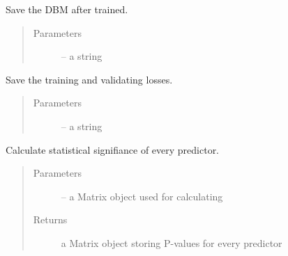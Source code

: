 \documentclass[letterpaper,10pt,english]{sphinxmanual}
\begin{document}
\begin{fulllineitems}

\begin{fulllineitems}
\label{\detokenize{index:dbm_py.interface.DBM.save}}
Save the DBM after trained.
\begin{quote}\begin{description}
\item[{Parameters}] \leavevmode
{} -- a string

\end{description}\end{quote}

\end{fulllineitems}


\begin{fulllineitems}
\label{\detokenize{index:dbm_py.interface.DBM.save_performance}}
Save the training and validating losses.
\begin{quote}\begin{description}
\item[{Parameters}] \leavevmode
{} -- a string

\end{description}\end{quote}

\end{fulllineitems}


\begin{fulllineitems}
\label{\detokenize{index:dbm_py.interface.DBM.ss}}
Calculate statistical signifiance of every predictor.
\begin{quote}\begin{description}
\item[{Parameters}] \leavevmode
{} -- a Matrix object used for calculating

\item[{Returns}] \leavevmode
a Matrix object storing P-values for every predictor

\end{description}\end{quote}


\end{fulllineitems}
\end{fulllineitems}
\end{document}
